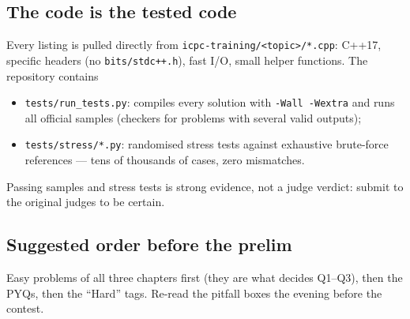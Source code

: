 \subsection*{The code is the tested code}
Every listing is pulled directly from \texttt{icpc-training/<topic>/*.cpp}:
C++17, specific headers (no \texttt{bits/stdc++.h}), fast I/O, small helper
functions. The repository contains
\begin{itemize}
  \item \texttt{tests/run\_tests.py}: compiles every solution with
        \texttt{-Wall -Wextra} and runs all official samples (checkers for
        problems with several valid outputs);
  \item \texttt{tests/stress/*.py}: randomised stress tests against exhaustive
        brute-force references --- tens of thousands of cases, zero mismatches.
\end{itemize}
Passing samples and stress tests is strong evidence, not a judge verdict:
submit to the original judges to be certain.

\subsection*{Suggested order before the prelim}
Easy problems of all three chapters first (they are what decides Q1--Q3),
then the PYQs, then the ``Hard'' tags. Re-read the pitfall boxes the evening
before the contest.

\newpage
